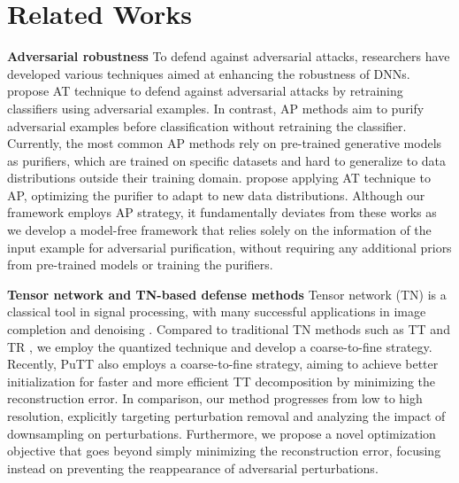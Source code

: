 \section{Related Works}
\label{Related}
\textbf{Adversarial robustness} \quad To defend against adversarial attacks, researchers have developed various techniques aimed at enhancing the robustness of DNNs.
\citet{goodfellow2014explaining} propose AT technique to defend against adversarial attacks by retraining classifiers using adversarial examples. In contrast, AP methods \citep{shi2021online,srinivasan2021robustifying} aim to purify adversarial examples before classification without retraining the classifier. Currently, the most common AP methods \citep{nie2022diffusion,bai2024diffusion} rely on pre-trained generative models as purifiers, which are trained on specific datasets and hard to generalize to data distributions outside their training domain. \citet{lin2024adversarial} propose applying AT technique to AP, optimizing the purifier to adapt to new data distributions.
Although our framework employs AP strategy, it fundamentally deviates from these works as we develop a model-free framework that relies solely on the information of the input example for adversarial purification, without requiring any additional priors from pre-trained models or training the purifiers.


\textbf{Tensor network and TN-based defense methods} \quad Tensor network (TN) is a classical tool in signal processing, with many successful applications in image completion and denoising \citep{kolda2009tensor,cichocki2015tensor}.
Compared to traditional TN methods such as TT \citep{oseledets2011tensor} and TR \citep{zhao2016tensor}, we employ the quantized technique \citep{khoromskij2011d} and develop a coarse-to-fine strategy. Recently, PuTT \citep{loeschcke2024coarse} also employs a coarse-to-fine strategy, aiming to achieve better initialization for faster and more efficient TT decomposition by minimizing the reconstruction error.
In comparison, our method progresses from low to high resolution, explicitly targeting perturbation removal and analyzing the impact of downsampling on perturbations. Furthermore, we propose a novel optimization objective that goes beyond simply minimizing the reconstruction error, focusing instead on preventing the reappearance of adversarial perturbations.

